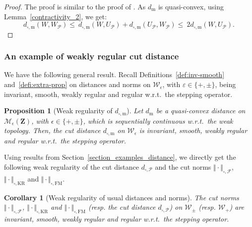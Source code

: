 \documentclass{amsart}
\newcommand{\wrt}{w.r.t.\ }
\theoremstyle{plain}
\newtheorem{cor}[Th]{Corollary}
\newtheorem{prop}[Th]{Proposition}
\theoremstyle{definition}
\newcommand{\Space}{\mathbf{Z}}
\newcommand{\signed}{\pm}
\newcommand{\cp}{\mathcal{P}}
\newcommand{\MeasEps}{\mathcal{M}_{\epsilon}(\Space)}
\newcommand{\Kernel}{\mathcal{W}_{\signed}}
\newcommand{\Kernelp}{\mathcal{W}_{+}}
\newcommand{\KernelEps}{\mathcal{W}_{\epsilon}}
\newcommand{\m}{\mathrm{m}}
\newcommand{\dmeas}{d_\m}
\newcommand{\dcut}{d_{\square,\m}}
\newcommand{\NcutFSymbol}{\Vert\cdot\Vert_{\square,\mathcal{F}}}
\newcommand{\dcutP}{d_{\square,\mathcal{P}}}
\newcommand{\mKR}{\text{KR}}
\newcommand{\NcutKRSymbol}{\Vert\cdot\Vert_{\square,\mKR}}
\newcommand{\mFM}{\text{FM}}
\newcommand{\NcutFMSymbol}{\Vert\cdot\Vert_{\square,\mFM}}
\newcommand{\eps}{\varepsilon}
\begin{document}
\begin{proof}
The proof is similar to the proof of \cite[Lemma~9.12]{Lovasz}.
As $\dmeas$ is quasi-convex, using Lemma~\ref{contractivity_2},
we get:
\begin{equation*}
\dcut(W, W_\mathcal{P})
 \leq\ \dcut(W , U_\cp) + \dcut(U_\cp , W_\mathcal{P})
 \leq\  2 \dcut(W ,U_\cp) .
\end{equation*}
\end{proof}



\subsubsection{An example of weakly regular cut distance}

We have the following general result. 
Recall Definitions~\ref{def:inv-smooth} and~\ref{defi:extra-prop} on distances and norms
on $\KernelEps$, with $\eps\in\{ +, \pm \}$, being  invariant, smooth, weakly
  regular and regular \wrt the stepping operator. 
  
\begin{prop}[Weak regularity of $\dcut$]\label{prop:weak_regular_2}
Let $\dmeas$ be a quasi-convex distance  on $\MeasEps$, with $\epsilon\in\{  +, \pm\}$,
  which is sequentially continuous   \wrt  the  weak topology.
  Then, the cut distance $\dcut$ on $\KernelEps$ is
  invariant, smooth, weakly regular 
  and regular \wrt the stepping operator. 
\end{prop}

Using  results  from  Section~\ref{section_examples_distance},  we directly get  the
following weak regularity of the cut distance $\dcutP$
and the cut norms $\NcutFSymbol$, $\NcutKRSymbol$ and $\NcutFMSymbol$.

\begin{cor}[Weak regularity of usual distances and norms]
  \label{cor:reg-dist-usuel}
  The cut norms $\NcutFSymbol$, $\NcutKRSymbol$ and $\NcutFMSymbol$
  (resp. the cut distance $\dcutP$)
 on $\Kernel$ (resp. $\Kernelp$)
 are invariant, smooth, weakly
  regular and regular \wrt the stepping operator.
\end{cor}
\end{document}
